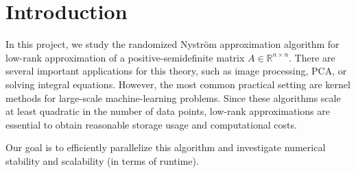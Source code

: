 \documentclass[a4paper, 12pt,oneside]{article}
\begin{document}
 
	 
	\clearpage
	\tableofcontents
	\thispagestyle{empty}
	\clearpage
	\setcounter{page}{1}

	\section{Introduction}
	In this project, we study the randomized Nystr\"om approximation algorithm for low-rank approximation of a positive-semidefinite matrix $A \in \mathbb{R}^{n \times n}$. There are several important applications for this theory, such as image processing, PCA, or solving integral equations. However, the most common practical setting are kernel methods for large-scale machine-learning problems. Since these algorithms scale at least quadratic in the number of data points, low-rank approximations are essential to obtain reasonable storage usage and computational costs.
	
	Our goal is to efficiently parallelize this algorithm and investigate numerical stability and scalability (in terms of runtime).
\end{document}
